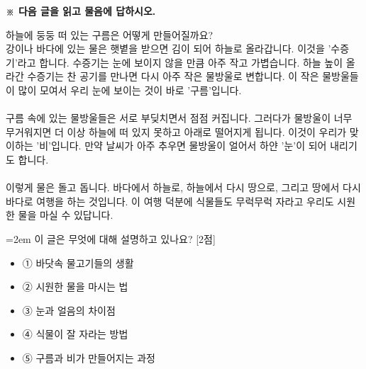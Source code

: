 \documentclass[12pt,a4paper]{article}
\newcommand{\qnum}[1]{%
  \tikz[baseline=(num.base)]{%
    \node[circle, fill=numCircle, text=white, inner sep=0pt,
          minimum size=18pt, font=\small\bfseries] (num) {#1};%
  }%
}
\newcommand{\pts}[1]{%
  \hfill\textcolor{ptsBadge}{[#1점]}%
}
\begin{document}
\vspace{4mm}
{\small\textbf{※ 다음 글을 읽고 물음에 답하시오.}}
\vspace{2mm}
\begin{tcolorbox}[passage]
하늘에 둥둥 떠 있는 구름은 어떻게 만들어질까요? \\{}
강이나 바다에 있는 물은 햇볕을 받으면 김이 되어 하늘로 올라갑니다. 이것을 '수증기'라고 합니다. 수증기는 눈에 보이지 않을 만큼 아주 작고 가볍습니다. 하늘 높이 올라간 수증기는 찬 공기를 만나면 다시 아주 작은 물방울로 변합니다. 이 작은 물방울들이 많이 모여서 우리 눈에 보이는 것이 바로 '구름'입니다. \\{}
\vspace{4pt} \\{}
구름 속에 있는 물방울들은 서로 부딪치면서 점점 커집니다. 그러다가 물방울이 너무 무거워지면 더 이상 하늘에 떠 있지 못하고 아래로 떨어지게 됩니다. 이것이 우리가 맞이하는 '비'입니다. 만약 날씨가 아주 추우면 물방울이 얼어서 하얀 '눈'이 되어 내리기도 합니다. \\{}
\vspace{4pt} \\{}
이렇게 물은 돌고 돕니다. 바다에서 하늘로, 하늘에서 다시 땅으로, 그리고 땅에서 다시 바다로 여행을 하는 것입니다. 이 여행 덕분에 식물들도 무럭무럭 자라고 우리도 시원한 물을 마실 수 있답니다.
\end{tcolorbox}
\vspace{3mm}
\begin{samepage}
{\hangindent=2em
\qnum{41}\enspace 이 글은 무엇에 대해 설명하고 있나요? \pts{2}
\par}

\vspace{3mm}
\begin{itemize}[leftmargin=2.5em, labelsep=0.3em, label={}, itemsep=4pt, parsep=1pt, topsep=0pt]
  \item ① 바닷속 물고기들의 생활
  \item ② 시원한 물을 마시는 법
  \item ③ 눈과 얼음의 차이점
  \item ④ 식물이 잘 자라는 방법
  \item ⑤ 구름과 비가 만들어지는 과정
\end{itemize}
\end{samepage}
\end{document}
